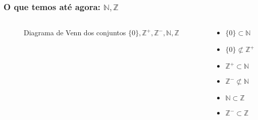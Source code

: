 \documentclass[usenames,dvipsnames,svgnames]{beamer}
\begin{document}
\begin{frame}
	
	\frametitle{O que temos até agora: $\mathbb{N}, \mathbb{Z}$}

	\begin{columns}[t]
	\begin{column}{.4\textwidth}
		\begin{figure}
			\def\Zcircle{		(0,0) 			circle (2.5cm)}
			\def\Ncircle{		(1.25cm:-1.25cm) circle (1.1cm)}
			\def\Zminuscircle{	(1.25cm:1.25cm) circle (1.1cm)}
			\def\Zpluscircle{	(1cm:-1.75cm) circle (0.5cm)}
			\def\zerocircle{	(1.5cm:-0.75cm) circle (0.5cm)}

			\caption{Diagrama de Venn dos conjuntos $\{0\}, \mathbb{Z}^{+}, \mathbb{Z}^{-}, \mathbb{N}, \mathbb{Z}$}
		\end{figure}
	\end{column}
	\begin{column}{.6\textwidth}
		\begin{itemize}
			\item $\{0\} \subset \mathbb{N}$
			\item $\{0\} \not\subset \mathbb{Z}^{+}$
			\item $\mathbb{Z}^{+} \subset \mathbb{N}$
			\item $\mathbb{Z}^{-} \not\subset \mathbb{N}$
			\item $\mathbb{N} \subset \mathbb{Z}$
			\item $\mathbb{Z}^{-} \subset \mathbb{Z}$
		\end{itemize}
	\end{column}
	\end{columns}

\end{frame}
\end{document}
